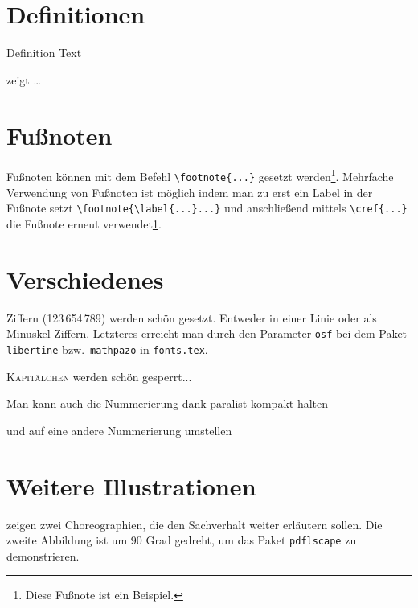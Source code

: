 

\section{Definitionen}
\begin{definition}[Title]
  \label{def:def1}
  Definition Text
\end{definition}

 zeigt \ldots

\section{Fußnoten}
Fußnoten können mit dem Befehl \verb+\footnote{...}+ gesetzt werden\footnote{\label{fussnote}Diese Fußnote ist ein Beispiel.}. Mehrfache Verwendung von Fußnoten ist möglich indem man zu erst ein Label in der Fußnote setzt \verb+\footnote{\label{...}...}+ und anschließend mittels \verb+\cref{...}+ die Fußnote erneut verwendet\cref{fussnote}.

\section{Verschiedenes}
\label{sec:diff}
\ifdeutsch
  Ziffern (123\,654\,789) werden schön gesetzt.
  Entweder in einer Linie oder als Minuskel-Ziffern.
  Letzteres erreicht man durch den Parameter \texttt{osf} bei dem Paket \texttt{libertine} bzw.\ \texttt{mathpazo} in \texttt{fonts.tex}.
\fi

\textsc{Kapitälchen} werden schön gesperrt...

\begin{compactenum}[I.]
  \item Man kann auch die Nummerierung dank paralist kompakt halten
  \item und auf eine andere Nummerierung umstellen
\end{compactenum}

\section{Weitere Illustrationen}
 zeigen zwei Choreographien, die den Sachverhalt weiter erläutern sollen.
Die zweite Abbildung ist um 90 Grad gedreht, um das Paket \texttt{pdflscape} zu demonstrieren.

